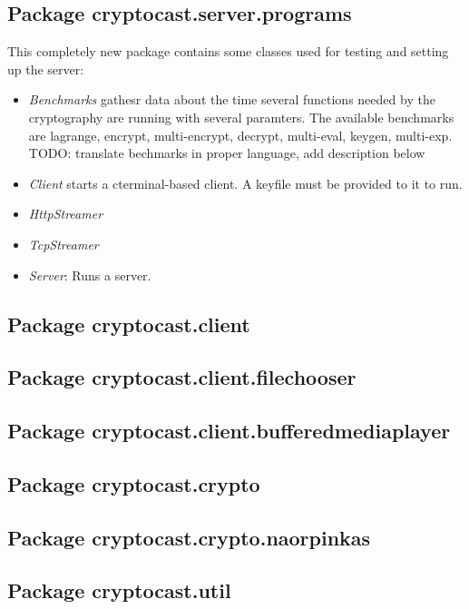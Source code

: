 \documentclass[a4paper,10pt]{scrartcl}
\begin{document}
\subsection{Package cryptocast.server.programs}
This  completely new package contains some classes used for testing and setting up the server:
\begin{itemize}
	\item \textit{Benchmarks} gathesr data about the time several functions needed by the cryptography are running
		with several paramters. The available benchmarks are  lagrange, encrypt, multi-encrypt, decrypt, multi-eval, keygen, multi-exp.
		TODO: translate bechmarks in proper language, add description below
	\item \textit{Client} starts a cterminal-based client. A keyfile must be provided to it to run.
	\item \textit{HttpStreamer} 
	\item \textit{TcpStreamer}
	\item \textit{Server}: Runs a server.
\end{itemize}
\subsection{Package cryptocast.client}
\subsection{Package cryptocast.client.filechooser}
\subsection{Package cryptocast.client.bufferedmediaplayer}
\subsection{Package cryptocast.crypto}
\subsection{Package cryptocast.crypto.naorpinkas}
\subsection{Package cryptocast.util}
\end{document}
